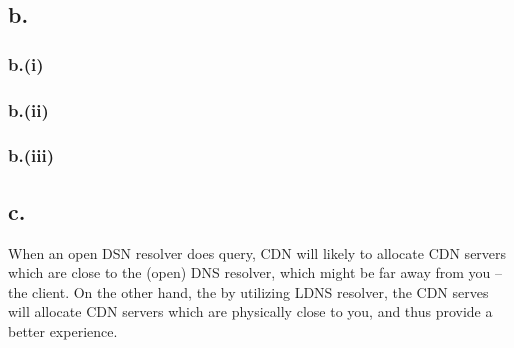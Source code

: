 \documentclass[12pt]{article}
\begin{document}
\subsection{b.}
\subsubsection{b.(i)}
\subsubsection{b.(ii)}
\subsubsection{b.(iii)}




\subsection{c.}

When an open DSN resolver does query, CDN will likely to allocate CDN servers which are close to the (open) DNS resolver, which might be far away from you -- the client. On the other hand, the by utilizing LDNS resolver, the CDN serves will allocate CDN servers which are physically close to you, and thus provide a better experience.


%
% 
% 
\end{document}
